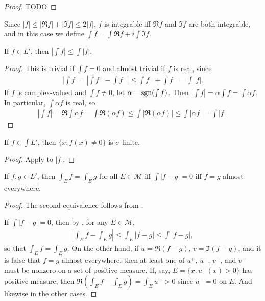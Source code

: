 \begin{proof}
    TODO
\end{proof}

Since $|f| \le |\Re f| + |\Im f| \le 2 |f|$, $f$ is integrable iff $\Re f$ and $\Im f$ are both integrable, and in this case we define $\int f = \int \Re f + i \int \Im f$. 

\begin{proposition}
    If $f \in L'$, then $|\int f| \le \int |f|$.
\end{proposition}

\begin{proof}
    This is trivial if $\int f = 0$ and almost trivial if $f$ is real, since
    \begin{align}
        \left| \int f \right| = \left| \int f^{+} - \int f^{-} \right| \le \int f^{+} + \int f^{-} = \int |f|.
    \end{align}
    If $f$ is complex-valued and $\int f \ne 0$, let $\alpha = \mathrm{sgn}(\int f)$.
    Then $|\int f| = \alpha \int f = \int \alpha f$.
    In particular, $\int \alpha f$ is real, so
    \begin{align}
        \left| \int f \right| = \Re \int \alpha f = \int \Re(\alpha f) \le \int |\Re(\alpha f)| \le \int |\alpha f| = \int |f|.
    \end{align}
\end{proof}

\begin{proposition}
    If $f \in \int L'$, then $\{ x: f(x) \ne 0 \}$ is $\sigma$-finite.
\end{proposition}

\begin{proof}
    Apply  to $|f|$.
\end{proof}

\begin{proposition}
    If $f, g \in L'$, then $\int_E f = \int_E g$ for all $E \in \mathcal{M}$ iff $\int |f-g| = 0$ iff $f=g$ almost everywhere.
\end{proposition}

\begin{proof}
    The second equivalence follows from .

    If $\int |f-g| =0$, then by , for any $E \in \mathcal{M}$,
    \begin{align}
        \left| \int_E f - \int_E g \right| \le \int_E |f-g| \le \int |f-g|, 
    \end{align}
    so that $\int_E f = \int_E g$.
    On the other hand, if $u = \Re(f-g)$, $v = \Im(f-g)$, and it is false that $f=g$ almost everywhere, then at least one of $u^+$, $u^-$, $v^+$, and $v^-$ must be nonzero on a set of positive measure.
    If, say, $E = \{ x: u^+(x) > 0 \}$ has positive measure, then $\Re(\int_E f - \int_E g) = \int_E u^+ >0$ since $u^- = 0$ on $E$.
    And likewise in the other cases.
\end{proof}

